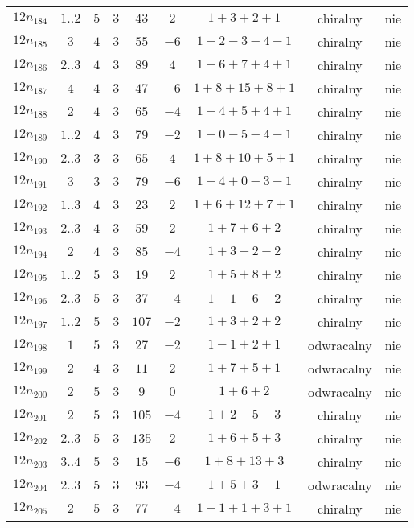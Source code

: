 \begin{longtable}{ccccccccc}
$12n_{184}$ & $1..2$ & $5$ & $3$ & $43$ & $2$ & $1+3+2+1$ & chiralny & nie \\
$12n_{185}$ & $3$ & $4$ & $3$ & $55$ & $-6$ & $1+2-3-4-1$ & chiralny & nie \\
$12n_{186}$ & $2..3$ & $4$ & $3$ & $89$ & $4$ & $1+6+7+4+1$ & chiralny & nie \\
$12n_{187}$ & $4$ & $4$ & $3$ & $47$ & $-6$ & $1+8+15+8+1$ & chiralny & nie \\
$12n_{188}$ & $2$ & $4$ & $3$ & $65$ & $-4$ & $1+4+5+4+1$ & chiralny & nie \\
$12n_{189}$ & $1..2$ & $4$ & $3$ & $79$ & $-2$ & $1+0-5-4-1$ & chiralny & nie \\
$12n_{190}$ & $2..3$ & $3$ & $3$ & $65$ & $4$ & $1+8+10+5+1$ & chiralny & nie \\
$12n_{191}$ & $3$ & $3$ & $3$ & $79$ & $-6$ & $1+4+0-3-1$ & chiralny & nie \\
$12n_{192}$ & $1..3$ & $4$ & $3$ & $23$ & $2$ & $1+6+12+7+1$ & chiralny & nie \\
$12n_{193}$ & $2..3$ & $4$ & $3$ & $59$ & $2$ & $1+7+6+2$ & chiralny & nie \\
$12n_{194}$ & $2$ & $4$ & $3$ & $85$ & $-4$ & $1+3-2-2$ & chiralny & nie \\
$12n_{195}$ & $1..2$ & $5$ & $3$ & $19$ & $2$ & $1+5+8+2$ & chiralny & nie \\
$12n_{196}$ & $2..3$ & $5$ & $3$ & $37$ & $-4$ & $1-1-6-2$ & chiralny & nie \\
$12n_{197}$ & $1..2$ & $5$ & $3$ & $107$ & $-2$ & $1+3+2+2$ & chiralny & nie \\
$12n_{198}$ & $1$ & $5$ & $3$ & $27$ & $-2$ & $1-1+2+1$ & odwracalny & nie \\
$12n_{199}$ & $2$ & $4$ & $3$ & $11$ & $2$ & $1+7+5+1$ & odwracalny & nie \\
$12n_{200}$ & $2$ & $5$ & $3$ & $9$ & $0$ & $1+6+2$ & odwracalny & nie \\
$12n_{201}$ & $2$ & $5$ & $3$ & $105$ & $-4$ & $1+2-5-3$ & chiralny & nie \\
$12n_{202}$ & $2..3$ & $5$ & $3$ & $135$ & $2$ & $1+6+5+3$ & chiralny & nie \\
$12n_{203}$ & $3..4$ & $5$ & $3$ & $15$ & $-6$ & $1+8+13+3$ & chiralny & nie \\
$12n_{204}$ & $2..3$ & $5$ & $3$ & $93$ & $-4$ & $1+5+3-1$ & odwracalny & nie \\
$12n_{205}$ & $2$ & $5$ & $3$ & $77$ & $-4$ & $1+1+1+3+1$ & chiralny & nie \\

\end{longtable}
